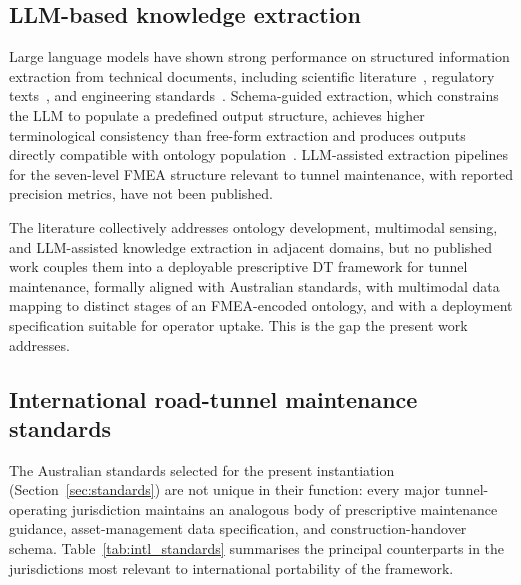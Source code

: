 \documentclass[11pt,a4paper]{article}
\begin{document}
\subsection{LLM-based knowledge extraction}

Large language models have shown strong performance on structured information extraction from technical documents, including scientific literature~\citep{Wei2022}, regulatory texts~\citep{Katz2024}, and engineering standards~\citep{Xu2025,Ge2026}. Schema-guided extraction, which constrains the LLM to populate a predefined output structure, achieves higher terminological consistency than free-form extraction and produces outputs directly compatible with ontology population~\citep{Caufield2024,dagdelen2024}. LLM-assisted extraction pipelines for the seven-level FMEA structure relevant to tunnel maintenance, with reported precision metrics, have not been published.

The literature collectively addresses ontology development, multimodal sensing, and LLM-assisted knowledge extraction in adjacent domains, but no published work couples them into a deployable prescriptive DT framework for tunnel maintenance, formally aligned with Australian standards, with multimodal data mapping to distinct stages of an FMEA-encoded ontology, and with a deployment specification suitable for operator uptake. This is the gap the present work addresses.

\subsection{International road-tunnel maintenance standards}
\label{sec:lit_intl}

The Australian standards selected for the present instantiation (Section~\ref{sec:standards}) are not unique in their function: every major tunnel-operating jurisdiction maintains an analogous body of prescriptive maintenance guidance, asset-management data specification, and construction-handover schema. Table~\ref{tab:intl_standards} summarises the principal counterparts in the jurisdictions most relevant to international portability of the framework.
\end{document}
